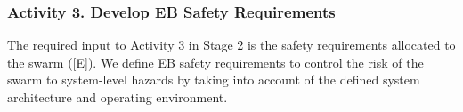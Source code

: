 \documentclass[runningheads]{llncs}
\begin{document}



\vspace{-4ex}
\subsubsection*{Activity 3. Develop EB Safety Requirements}

The required input to Activity 3 in Stage 2 is the safety requirements allocated to the swarm ([E]).
We define EB safety requirements to control the risk of the swarm to system-level hazards by taking into account of the defined system architecture and operating environment. 

\end{document}
